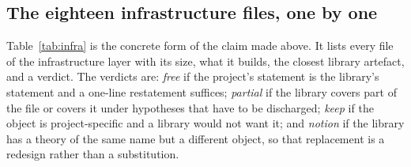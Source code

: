 \subsection{The eighteen infrastructure files, one by one}
\label{sec:infra-table}

Table~\ref{tab:infra} is the concrete form of the claim made above. It lists every file of
the infrastructure layer with its size, what it builds, the closest library artefact, and a
verdict. The verdicts are: \emph{free} if the project's statement is the library's statement
and a one-line restatement suffices; \emph{partial} if the library covers part of the file or
covers it under hypotheses that have to be discharged; \emph{keep} if the object is
project-specific and a library would not want it; and \emph{notion} if the library has a
theory of the same name but a different object, so that replacement is a redesign rather
than a substitution.

